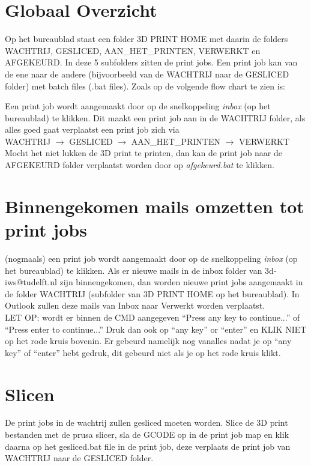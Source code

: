 \documentclass{article}
\newcommand{\quotes}[1]{``#1''}
\begin{document}
\section*{Globaal Overzicht}
Op het bureaublad staat een folder 3D PRINT HOME met daarin de folders WACHTRIJ, GESLICED, AAN\_HET\_PRINTEN, VERWERKT en AFGEKEURD. In deze 5 subfolders zitten de print jobs. Een print job kan van de ene naar de andere (bijvoorbeeld van de WACHTRIJ naar de GESLICED folder) met batch files (.bat files). Zoals op de volgende flow chart te zien is:

\begin{center}
\scalebox{1.1}{
  
}
\end{center}

Een print job wordt aangemaakt door op de snelkoppeling \textit{inbox} (op het bureaublad) te klikken. Dit maakt een print job aan in de WACHTRIJ folder, als alles goed gaat verplaatst een print job zich via\\

WACHTRIJ $\rightarrow$ GESLICED $\rightarrow$ AAN\_HET\_PRINTEN $\rightarrow$ VERWERKT\\

Mocht het niet lukken de 3D print te printen, dan kan de print job naar de AFGEKEURD folder verplaatst worden door op \textit{afgekeurd.bat} te klikken.\\

\section*{Binnengekomen mails omzetten tot print jobs}
(nogmaals) een print job wordt aangemaakt door op de snelkoppeling \textit{inbox} (op het bureaublad) te klikken. Als er nieuwe mails in de inbox folder van 3d-iws@tudelft.nl zijn binnengekomen, dan worden nieuwe print jobs aangemaakt in de folder WACHTRIJ (subfolder van 3D PRINT HOME op het bureaublad). In Outlook zullen deze mails van Inbox naar Verwerkt worden verplaatst.\\

LET OP: wordt er binnen de CMD aangegeven \quotes{Press any key to continue...} of \quotes{Press enter to continue...} Druk dan ook op \quotes{any key} or \quotes{enter} en KLIK NIET op het rode kruis bovenin. Er gebeurd namelijk nog vanalles nadat je op \quotes{any key} of \quotes{enter} hebt gedruk, dit gebeurd niet als je op het rode kruis klikt.\\

\section*{Slicen}
De print jobs in de wachtrij zullen gesliced moeten worden. Slice de 3D print bestanden met de prusa slicer, sla de GCODE op in de print job map en klik daarna op het gesliced.bat file in de print job, deze verplaats de print job van WACHTRIJ naar de GESLICED folder.
\end{document}
